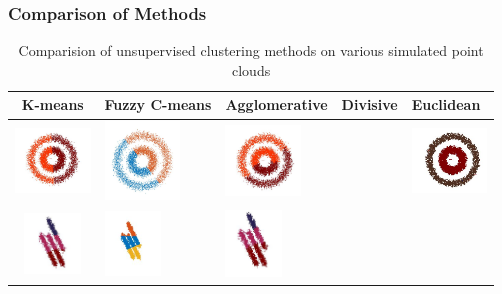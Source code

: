 \documentclass[12pt]{drexelthesis}
\let\Oldsubsubsection\subsubsection
\renewcommand{\subsubsection}{\FloatBarrier\Oldsubsubsection}
\begin{document}
\subsubsection{Comparison of Methods}

 \begin{table}[h!]
     \begin{center}
           \caption[Comparison of Unsupervised clustering methods]{Comparision of unsupervised clustering methods on various simulated point clouds}
     \begin{tabular}{ | c | p{3cm} | p{3cm} | p{3cm} | p{3cm} | }
     \hline
      K-means & Fuzzy C-means & Agglomerative & Divisive & Euclidean \\ 
      \hline
      		\includegraphics[width=2cm]{2d-cluster-tests/k-means/concentric.jpg}
      & 
      		\includegraphics[trim={0 0 0 2cm},clip, width=2cm]{2d-cluster-tests/fcm/concentric.jpg}
      & 
      		\includegraphics[trim={0 1cm 0 1cm},clip, width=2cm]{2d-cluster-tests/agglomerative/concentric.jpg}
      &

      &
      		\includegraphics[width=2cm]{2d-cluster-tests/euclidean-distance/concentric.jpg}
      \\ \hline
      
            \includegraphics[width=1.5cm]{2d-cluster-tests/k-means/lines.jpg}
      & 
             \includegraphics[width=1.5cm]{2d-cluster-tests/fcm/lines.jpg}    
      & 
             \includegraphics[trim={0 1cm 0 0cm},clip,width=1.5cm]{2d-cluster-tests/agglomerative/lines.jpg}    
      &


\end{tabular}
\end{center}
\end{table}
\end{document}
